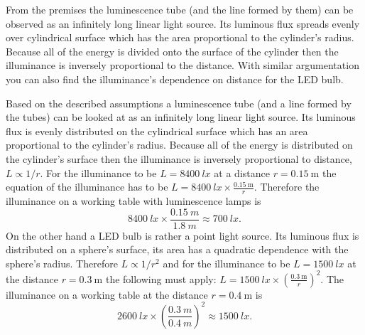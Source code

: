 \hinteng
From the premises the luminescence tube (and the line formed by them) can be observed as an infinitely long linear light source. Its luminous flux spreads evenly over cylindrical surface which has the area proportional to the cylinder’s radius. Because all of the energy is divided onto the surface of the cylinder then the illuminance is inversely proportional to the distance. With similar argumentation you can also find the illuminance’s dependence on distance for the LED bulb.

\solueng
Based on the described assumptions a luminescence tube (and a line formed by the tubes) can be looked at as an infinitely long linear light source. Its luminous flux is evenly distributed on the cylindrical surface which has an area proportional to the cylinder’s radius. Because all of the energy is distributed on the cylinder’s surface then the illuminance is inversely proportional to distance, $L \propto 1/r$. For the illuminance to be $L=\SI{8400}{lx}$ at a distance $r=\SI{0.15}{\meter}$ the equation of the illuminance has to be $L=\SI{8400}{lx}\times \frac{\SI{0.15}{\meter}} r$. Therefore the illuminance on a working table with luminescence lamps is 
\[
\SI{8400}{lx}\times\frac{\SI{0.15}{m}}{\SI{1.8}{m}}\approx\SI{700}{lx}.
\]
On the other hand a LED bulb is rather a point light source. Its luminous flux is distributed on a sphere’s surface, its area has a quadratic dependence with the sphere’s radius. Therefore $L \propto 1/r^2$ and for the illuminance to be $L=\SI{1500}{lx}$ at the distance $r=\SI{0.3}{\meter}$ the following must apply: $L=\SI{1500}{lx}\times \left(\frac{\SI{0.3}{\meter}} {r}\right)^2$. The illuminance on a working table at the distance $r=\SI{0.4}{\meter}$ is
\[
\SI{2600}{lx}\times\left(\frac{\SI{0.3}{m}}{\SI{0.4}{m}}\right)^2\approx\SI{1500}{lx}.
\]
\probend